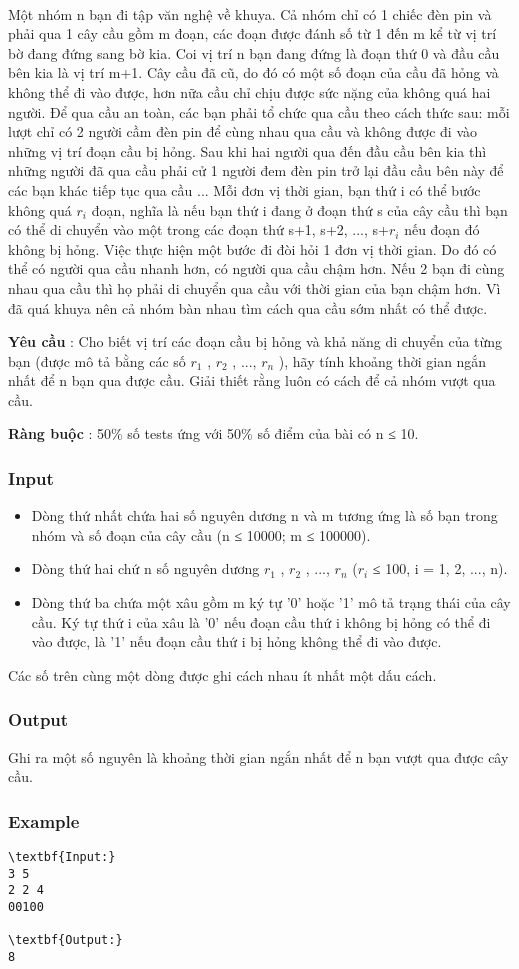 

 

Một nhóm n bạn đi tập văn nghệ về khuya. Cả nhóm chỉ có 1 chiếc đèn pin và phải qua 1 cây cầu gồm m đoạn, các đoạn được đánh số từ 1 đến m kể từ vị trí bờ đang đứng sang bờ kia. Coi vị trí n bạn đang đứng là đoạn thứ 0 và đầu cầu bên kia là vị trí m+1. Cây cầu đã cũ, do đó có một số đoạn của cầu đã hỏng và không thể đi vào được, hơn nữa cầu chỉ chịu được sức nặng của không quá hai người. Để qua cầu an toàn, các bạn phải tổ chức qua cầu theo cách thức sau: mỗi lượt chỉ có 2 người cầm đèn pin để cùng nhau qua cầu và không được đi vào những vị trí đoạn cầu bị hỏng. Sau khi hai người qua đến đầu cầu bên kia thì những người đã qua cầu phải cử 1 người đem đèn pin trở lại đầu cầu bên này để các bạn khác tiếp tục qua cầu ... Mỗi đơn vị thời gian, bạn thứ i có thể bước không quá $r_{i}$ đoạn, nghĩa là nếu bạn thứ i đang ở đoạn thứ s của cây cầu thì bạn có thể di chuyển vào một trong các đoạn thứ s+1, s+2, ..., s+$r_{i}$ nếu đoạn đó không bị hỏng. Việc thực hiện một bước đi đòi hỏi 1 đơn vị thời gian. Do đó có thể có người qua cầu nhanh hơn, có người qua cầu chậm hơn. Nếu 2 bạn đi cùng nhau qua cầu thì họ phải di chuyển qua cầu với thời gian của bạn chậm hơn. Vì đã quá khuya nên cả nhóm bàn nhau tìm cách qua cầu sớm nhất có thể được.

\textbf{Yêu cầu } : Cho biết vị trí các đoạn cầu bị hỏng và khả năng di chuyển của từng bạn (được mô tả bằng các số $r_{1}$ , $r_{2}$ , ..., $r_{n}$ ), hãy tính khoảng thời gian ngắn nhất để n bạn qua được cầu. Giải thiết rằng luôn có cách để cả nhóm vượt qua cầu.

\textbf{Ràng buộc } : 50\% số tests ứng với 50\% số điểm của bài có n ≤ 10.

\subsubsection{Input}
\begin{itemize}
	\item Dòng thứ nhất chứa hai số nguyên dương n và m tương ứng là số bạn trong nhóm và số đoạn của cây cầu (n ≤ 10000; m ≤ 100000).
	\item Dòng thứ hai chứ n số nguyên dương $r_{1}$ , $r_{2}$ , ..., $r_{n}$ ($r_{i}$ ≤ 100, i = 1, 2, ..., n).
	\item Dòng thứ ba chứa một xâu gồm m ký tự '0' hoặc '1' mô tả trạng thái của cây cầu. Ký tự thứ i của xâu là '0' nếu đoạn cầu thứ i không bị hỏng có thể đi vào được, là '1' nếu đoạn cầu thứ i bị hỏng không thể đi vào được.
\end{itemize}

Các số trên cùng một dòng được ghi cách nhau ít nhất một dấu cách.

\subsubsection{Output}

Ghi ra một số nguyên là khoảng thời gian ngắn nhất để n bạn vượt qua được cây cầu.

\subsubsection{Example}
\begin{verbatim}
\textbf{Input:}
3 5
2 2 4
00100

\textbf{Output:}
8
\end{verbatim}
